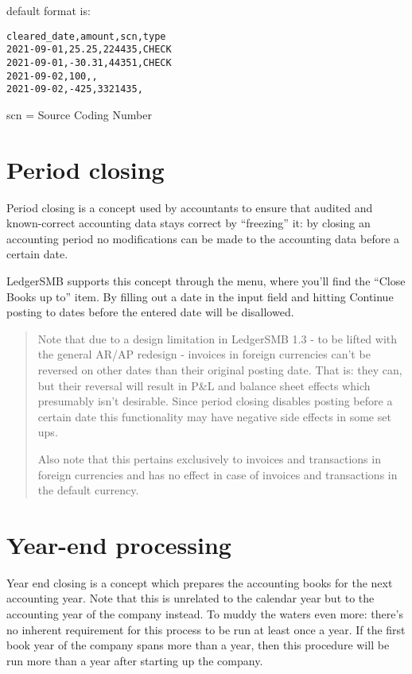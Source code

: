 default format is:
\begin{verbatim}
cleared_date,amount,scn,type
2021-09-01,25.25,224435,CHECK
2021-09-01,-30.31,44351,CHECK
2021-09-02,100,,
2021-09-02,-425,3321435,
\end{verbatim}

scn = Source Coding Number

\section{Period closing}
\label{sec-business-processes-accounting-period-closing}

Period closing is a concept used by accountants to ensure that audited and
known-correct accounting data stays correct by ``freezing'' it: by closing
an accounting period no modifications can be made to the accounting data
before a certain date.

LedgerSMB supports this concept through the 
menu, where you'll find the ``Close Books up to'' item. By filling out a date
in the input field and hitting Continue posting to dates before the entered
date will be disallowed.


\begin{quote}
Note that due to a design limitation in LedgerSMB 1.3 - to be lifted with the
general AR/AP redesign - invoices in foreign currencies can't be reversed on
other dates than their original posting date. That is: they can, but their
reversal will result in P\&L and balance sheet effects which presumably isn't
desirable. Since period closing disables posting before a certain date this
functionality may have negative side effects in some set ups.

Also note that this pertains exclusively to invoices and transactions in foreign
currencies and has no effect in case of invoices and transactions in the default
currency.
\end{quote}

\section{Year-end processing}
\label{sec-business-processes-accounting-year-end-processing}

Year end closing is a concept which prepares the accounting books for the next
accounting year. Note that this is unrelated to the calendar year but to the
accounting year of the company instead. To muddy the waters even more: there's
no inherent requirement for this process to be run at least once a year. If the
first book year of the company spans more than a year, then this procedure will
be run more than a year after starting up the company.

